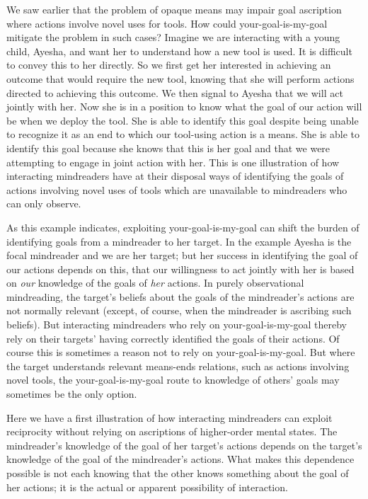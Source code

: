 \documentclass[12pt,\papersize]{extarticle}
\begin{document}
We saw earlier that the problem of opaque means  may impair goal ascription where actions involve novel uses for tools.
How could your-goal-is-my-goal mitigate the problem in such cases?
Imagine we are interacting with a young child,
Ayesha,
and want her to understand how a new tool is used.  
It is difficult to convey this to her directly.  
So we first get her interested in achieving an outcome that would require the new tool,
knowing that she will perform actions directed to achieving this outcome.  
We then signal to Ayesha that we will act jointly with her.  
Now she is in a position to know what the goal of our action will be when we deploy the tool.  
She is able to identify this goal 
despite being unable to recognize it as an end to which our tool-using action is a means.
She is able to identify this goal 
because she knows that this is her goal
and that we were attempting to engage in joint action with her.
This is one illustration of how 
interacting mindreaders have at their disposal ways of
identifying the goals of actions involving novel uses of tools
which are unavailable to mindreaders who can only observe.


As this example indicates,
exploiting your-goal-is-my-goal 
can shift the burden of identifying goals from a mindreader to her target.
In the example Ayesha is the focal mindreader and we are her target;
but her success in identifying the goal of our actions
depends on this,
that our willingness to act jointly with her is based on \emph{our} knowledge of the goals of \emph{her} actions.
In purely observational mindreading, the target's beliefs about the goals of the mindreader's actions are not normally relevant (except, of course, when the mindreader is ascribing such beliefs).
But interacting mindreaders who rely on your-goal-is-my-goal
thereby rely on their targets' having correctly identified the goals of their actions.
Of course this is sometimes a reason not to rely on your-goal-is-my-goal.
But where the target understands relevant means-ends relations,
such as actions involving novel tools,
the your-goal-is-my-goal route to knowledge of others' goals may sometimes be the only option.

Here we have a first illustration of how
interacting mindreaders can exploit reciprocity 
without relying on ascriptions of higher-order mental states.
The mindreader's knowledge of the goal of her target's actions depends on the target's knowledge of the goal of the mindreader's actions.
What makes this dependence possible is not each knowing that the other knows something about the goal of her actions;
 it is  the actual or apparent  possibility of interaction.
\end{document}
